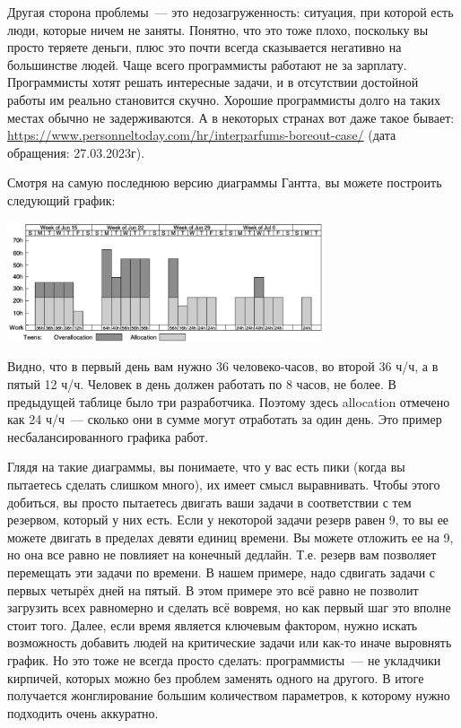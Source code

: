 \documentclass{../../text-style}
\begin{document}
Другая сторона проблемы~--- это недозагруженность: ситуация, при которой есть люди, которые ничем не заняты. Понятно, что это тоже плохо, поскольку вы просто теряете деньги, плюс это почти всегда сказывается негативно на большинстве людей. Чаще всего программисты работают не за зарплату. Программисты хотят решать интересные задачи, и в отсутствии достойной работы им реально становится скучно. Хорошие программисты долго на таких местах обычно не задерживаются. А в некоторых странах вот даже такое бывает: \url{https://www.personneltoday.com/hr/interparfums-boreout-case/} (дата обращения: 27.03.2023г).

Смотря на самую последнюю версию диаграммы Гантта, вы можете построить следующий график:

\begin{center}
    \includegraphics[width=0.7\textwidth]{resourceAllocation.png}
\end{center}

Видно, что в первый день вам нужно 36 человеко-часов, во второй 36 ч/ч, а в пятый 12 ч/ч. Человек в день должен работать по 8 часов, не более. В предыдущей таблице было три разработчика. Поэтому здесь allocation отмечено как 24 ч/ч~--- сколько они в сумме могут отработать за один день. Это пример несбалансированного графика работ.

Глядя на такие диаграммы, вы понимаете, что у вас есть пики (когда вы пытаетесь сделать слишком много), их имеет смысл выравнивать. Чтобы этого добиться, вы просто пытаетесь двигать ваши задачи в соответствии с тем резервом, который у них есть. Если у некоторой задачи резерв равен 9, то вы ее можете двигать в пределах девяти единиц времени. Вы можете отложить ее на 9, но она все равно не повлияет на конечный дедлайн. Т.е. резерв вам позволяет перемещать эти задачи по времени. В нашем примере, надо сдвигать задачи с первых четырёх дней на пятый. В этом примере это всё равно не позволит загрузить всех равномерно и сделать всё вовремя, но как первый шаг это вполне стоит того. Далее, если время является ключевым фактором, нужно искать возможность добавить людей на критические задачи или как-то иначе выровнять график. Но это тоже не всегда просто сделать: программисты~--- не укладчики кирпичей, которых можно без проблем заменять одного на другого. В итоге получается жонглирование большим количеством параметров, к которому нужно подходить очень аккуратно.
\end{document}
